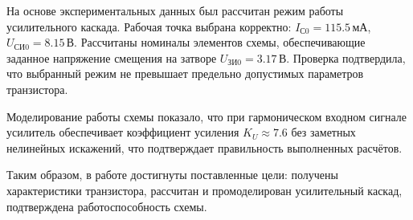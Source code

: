 На основе экспериментальных данных был рассчитан режим работы усилительного каскада. Рабочая точка выбрана корректно: \( I_{\text{С0}} = 115.5 \, \text{мА} \), \( U_{\text{СИ0}} = 8.15 \, \text{В} \). Рассчитаны номиналы элементов схемы, обеспечивающие заданное напряжение смещения на затворе \( U_{\text{ЗИ0}} = 3.17 \, \text{В} \). Проверка подтвердила, что выбранный режим не превышает предельно допустимых параметров транзистора.

Моделирование работы схемы показало, что при гармоническом входном сигнале усилитель обеспечивает коэффициент усиления \( K_U \approx 7.6 \) без заметных нелинейных искажений, что подтверждает правильность выполненных расчётов.

Таким образом, в работе достигнуты поставленные цели: получены характеристики транзистора, рассчитан и промоделирован усилительный каскад, подтверждена работоспособность схемы.